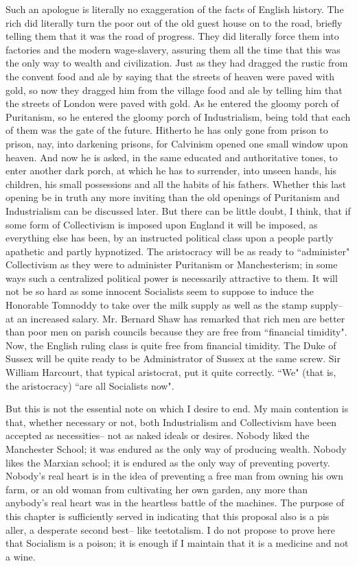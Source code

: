 \documentclass[final,10pt,letterpaper,twocolumn,openany]{book}
\begin{document}
Such an apologue is literally no exaggeration of the facts of English
history. The rich did literally turn the poor out of the old guest house on to
the road, briefly telling them that it was the road of progress. They did
literally force them into factories and the modern wage-slavery, assuring
them all the time that this was the only way to wealth and civilization. Just
as they had dragged the rustic from the convent food and ale by saying
that the streets of heaven were paved with gold, so now they dragged him
from the village food and ale by telling him that the streets of London
were paved with gold. As he entered the gloomy porch of Puritanism, so
he entered the gloomy porch of Industrialism, being told that each of them
was the gate of the future. Hitherto he has only gone from prison to prison,
nay, into darkening prisons, for Calvinism opened one small window upon
heaven. And now he is asked, in the same educated and authoritative tones,
to enter another dark porch, at which he has to surrender, into unseen
hands, his children, his small possessions and all the habits of his fathers.
Whether this last opening be in truth any more inviting than the old
openings of Puritanism and Industrialism can be discussed later. But there
can be little doubt, I think, that if some form of Collectivism is imposed
upon England it will be imposed, as everything else has been, by an
instructed political class upon a people partly apathetic and partly
hypnotized. The aristocracy will be as ready to ``administer" Collectivism
as they were to administer Puritanism or Manchesterism; in some ways
such a centralized political power is necessarily attractive to them. It will
not be so hard as some innocent Socialists seem to suppose to induce the
Honorable Tomnoddy to take over the milk supply as well as the stamp
supply--at an increased salary. Mr. Bernard Shaw has remarked that rich
men are better than poor men on parish councils because they are free
from ``financial timidity". Now, the English ruling class is quite free from
financial timidity. The Duke of Sussex will be quite ready to be
Administrator of Sussex at the same screw. Sir William Harcourt, that
typical aristocrat, put it quite correctly. ``We" (that is, the aristocracy) ``are
all Socialists now".

But this is not the essential note on which I desire to end. My main
contention is that, whether necessary or not, both Industrialism and
Collectivism have been accepted as necessities-- not as naked ideals or
desires. Nobody liked the Manchester School; it was endured as the only
way of producing wealth. Nobody likes the Marxian school; it is endured
as the only way of preventing poverty. Nobody's real heart is in the idea of
preventing a free man from owning his own farm, or an old woman from
cultivating her own garden, any more than anybody's real heart was in the
heartless battle of the machines. The purpose of this chapter is sufficiently
served in indicating that this proposal also is a pis aller, a desperate second
best-- like teetotalism. I do not propose to prove here that Socialism is a
poison; it is enough if I maintain that it is a medicine and not a wine.
\end{document}

